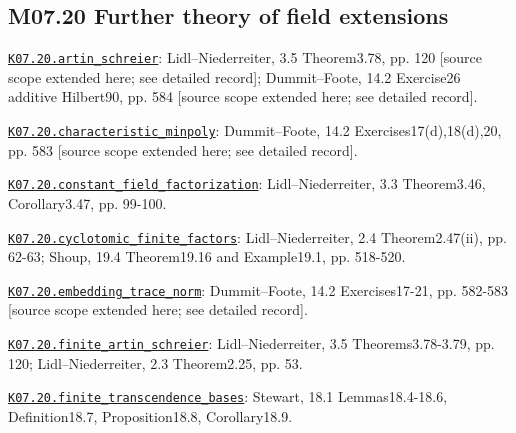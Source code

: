 \subsection*{M07.20 Further theory of field extensions}
\par\smallskip\noindent\hypertarget{src:K07.20.artin_schreier}{}\label{src:K07.20.artin_schreier}\hyperref[K07.20.artin_schreier]{\texttt{K07.20.artin\_schreier}}: Lidl--Niederreiter, 3.5 Theorem3.78, pp. 120 [source scope extended here; see detailed record]; Dummit--Foote, 14.2 Exercise26 additive Hilbert90, pp. 584 [source scope extended here; see detailed record].
\par\smallskip\noindent\hypertarget{src:K07.20.characteristic_minpoly}{}\label{src:K07.20.characteristic_minpoly}\hyperref[K07.20.characteristic_minpoly]{\texttt{K07.20.characteristic\_minpoly}}: Dummit--Foote, 14.2 Exercises17(d),18(d),20, pp. 583 [source scope extended here; see detailed record].
\par\smallskip\noindent\hypertarget{src:K07.20.constant_field_factorization}{}\label{src:K07.20.constant_field_factorization}\hyperref[K07.20.constant_field_factorization]{\texttt{K07.20.constant\_field\_factorization}}: Lidl--Niederreiter, 3.3 Theorem3.46, Corollary3.47, pp. 99-100.
\par\smallskip\noindent\hypertarget{src:K07.20.cyclotomic_finite_factors}{}\label{src:K07.20.cyclotomic_finite_factors}\hyperref[K07.20.cyclotomic_finite_factors]{\texttt{K07.20.cyclotomic\_finite\_factors}}: Lidl--Niederreiter, 2.4 Theorem2.47(ii), pp. 62-63; Shoup, 19.4 Theorem19.16 and Example19.1, pp. 518-520.
\par\smallskip\noindent\hypertarget{src:K07.20.embedding_trace_norm}{}\label{src:K07.20.embedding_trace_norm}\hyperref[K07.20.embedding_trace_norm]{\texttt{K07.20.embedding\_trace\_norm}}: Dummit--Foote, 14.2 Exercises17-21, pp. 582-583 [source scope extended here; see detailed record].
\par\smallskip\noindent\hypertarget{src:K07.20.finite_artin_schreier}{}\label{src:K07.20.finite_artin_schreier}\hyperref[K07.20.finite_artin_schreier]{\texttt{K07.20.finite\_artin\_schreier}}: Lidl--Niederreiter, 3.5 Theorems3.78-3.79, pp. 120; Lidl--Niederreiter, 2.3 Theorem2.25, pp. 53.
\par\smallskip\noindent\hypertarget{src:K07.20.finite_transcendence_bases}{}\label{src:K07.20.finite_transcendence_bases}\hyperref[K07.20.finite_transcendence_bases]{\texttt{K07.20.finite\_transcendence\_bases}}: Stewart, 18.1 Lemmas18.4-18.6, Definition18.7, Proposition18.8, Corollary18.9.
